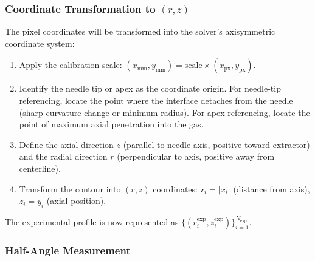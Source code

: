 \subsubsection{Coordinate Transformation to $(r, z)$}

The pixel coordinates will be transformed into the solver's axisymmetric coordinate system:
\begin{enumerate}
    \item Apply the calibration scale: $(x_{\text{mm}}, y_{\text{mm}}) = \text{scale} \times (x_{\text{px}}, y_{\text{px}})$.
    \item Identify the needle tip or apex as the coordinate origin. For needle-tip referencing, locate the point where the interface detaches from the needle (sharp curvature change or minimum radius). For apex referencing, locate the point of maximum axial penetration into the gas.
    \item Define the axial direction $z$ (parallel to needle axis, positive toward extractor) and the radial direction $r$ (perpendicular to axis, positive away from centerline).
    \item Transform the contour into $(r, z)$ coordinates: $r_i = |x_i|$ (distance from axis), $z_i = y_i$ (axial position).
\end{enumerate}

The experimental profile is now represented as $\{(r_i^{\exp}, z_i^{\exp})\}_{i=1}^{N_{\exp}}$.

\subsubsection{Half-Angle Measurement}

